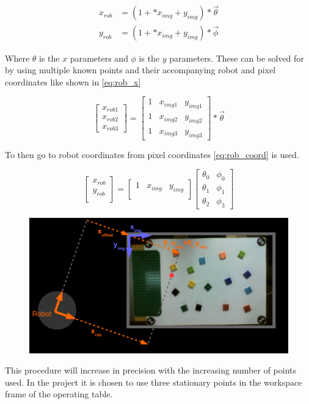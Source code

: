 \begin{equation}\label{eq:cam_calib}
\begin{split}
x_{rob}&=(1+*x_{img}+y_{img})*\vec{\theta}\\
y_{rob}&=(1+*x_{img}+y_{img}) * \vec{\phi}
\end{split}
\end{equation}

Where $\theta$ is the $ x $ parameters and $\phi$ is the $ y $ parameters. These can be solved for by using multiple known points and their accompanying robot and pixel coordinates like shown in \autoref{eq:rob_x}

\begin{equation}\label{eq:rob_pix}
\begin{bmatrix}
x_{rob1} \\
x_{rob2} \\
x_{rob3}
\end{bmatrix} 
 =
\begin{bmatrix}
1 & x_{img1} & y_{img1} \\
1 & x_{img2} & y_{img2} \\
1 & x_{img3} & y_{img3} 
\end{bmatrix}  
* \vec{\theta}
\end{equation}

To then go to robot coordinates from pixel coordinates \autoref{eq:rob_coord} is used.

\begin{equation}\label{eq:rob_coord}
\begin{bmatrix}
x_{rob} \\
y_{rob} \\
\end{bmatrix} 
= 
\begin{bmatrix}
1 & x_{img} & y_{img}\\
\end{bmatrix} 
\begin{bmatrix}
\theta_0 & \phi_0\\
\theta_1 & \phi_1\\
\theta_2 & \phi_3  
\end{bmatrix}  
\end{equation}

\begin{figure}[h]
\centering
\includegraphics[width=\textwidth]{figures/camera_robot_shortcut.png}
\caption{}
\label{fig:camera_robot_shortcut}
\end{figure}

This procedure will increase in precision with the increasing number of points used. In the project it is chosen to use three stationary points in the workspace frame of the operating table.
